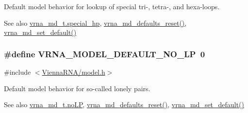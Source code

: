 Default model behavior for lookup of special tri-\/, tetra-\/, and hexa-\/loops. 

\begin{DoxySeeAlso}{See also}
\hyperlink{structvrna__md__s_add64a96d23e77ef1d0ddf8dfc5228143}{vrna\+\_\+md\+\_\+t.\+special\+\_\+hp}, \hyperlink{group__model__details_ga70834424cf804d149937de89f80ceb45}{vrna\+\_\+md\+\_\+defaults\+\_\+reset()}, \hyperlink{group__model__details_ga8ac6ff84936282436f822644bf841f66}{vrna\+\_\+md\+\_\+set\+\_\+default()} 
\end{DoxySeeAlso}
\subsubsection[{\texorpdfstring{V\+R\+N\+A\+\_\+\+M\+O\+D\+E\+L\+\_\+\+D\+E\+F\+A\+U\+L\+T\+\_\+\+N\+O\+\_\+\+LP}{VRNA_MODEL_DEFAULT_NO_LP}}]{\setlength{\rightskip}{0pt plus 5cm}\#define V\+R\+N\+A\+\_\+\+M\+O\+D\+E\+L\+\_\+\+D\+E\+F\+A\+U\+L\+T\+\_\+\+N\+O\+\_\+\+LP~0}\hypertarget{group__model__details_gab72462726dd60ed0d43339bbf7ee08ad}{}\label{group__model__details_gab72462726dd60ed0d43339bbf7ee08ad}


{\ttfamily \#include $<$\hyperlink{model_8h}{Vienna\+R\+N\+A/model.\+h}$>$}



Default model behavior for so-\/called \textquotesingle{}lonely pairs\textquotesingle{}. 

\begin{DoxySeeAlso}{See also}
\hyperlink{structvrna__md__s_a753200bf21cee0ea2df64afe43999f5d}{vrna\+\_\+md\+\_\+t.\+no\+LP}, \hyperlink{group__model__details_ga70834424cf804d149937de89f80ceb45}{vrna\+\_\+md\+\_\+defaults\+\_\+reset()}, \hyperlink{group__model__details_ga8ac6ff84936282436f822644bf841f66}{vrna\+\_\+md\+\_\+set\+\_\+default()} 
\end{DoxySeeAlso}
